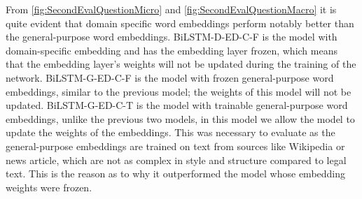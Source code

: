 


From \ref{fig:SecondEvalQuestionMicro} and \ref{fig:SecondEvalQuestionMacro} it is quite evident that domain specific word embeddings perform notably better than the general-purpose word embeddings. BiLSTM-D-ED-C-F is the model with domain-specific embedding and has the embedding layer frozen, which means that the embedding layer's weights will not be updated during the training of the network. BiLSTM-G-ED-C-F is the model with frozen general-purpose word embeddings, similar to the previous model; the weights of this model will not be updated. BiLSTM-G-ED-C-T is the model with trainable general-purpose word embeddings, unlike the previous two models, in this model we allow the model to update the weights of the embeddings. This was necessary to evaluate as the general-purpose embeddings are trained on text from sources like Wikipedia or news article, which are not as complex in style and structure compared to legal text. This is the reason as to why it outperformed the model whose embedding weights were frozen. 

